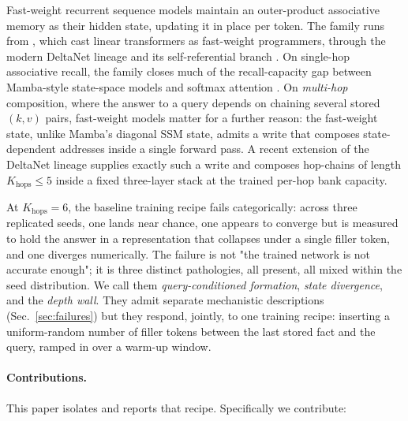 \documentclass[11pt]{article}
\begin{document}
Fast-weight recurrent sequence models maintain an outer-product
associative memory as their hidden state, updating it in place per
token. The family runs from \citet{schlag2021linear}, which cast
linear transformers as fast-weight programmers, through the modern
DeltaNet lineage \citep{yang2024deltanet,yang2024gated} and its
self-referential branch \citep{irie2022srwm}. On single-hop associative recall, the family closes much of
the recall-capacity gap between Mamba-style state-space models
\citep{gu2024mamba,dao2024mamba2} and softmax attention
\citep{arora2023zoology,arora2024based}. On \emph{multi-hop}
composition, where the answer to a query depends on chaining several
stored $(k, v)$ pairs, fast-weight models matter for a further
reason: the fast-weight state, unlike Mamba's diagonal SSM state,
admits a write that composes state-dependent addresses inside a
single forward pass. A recent extension of the DeltaNet
lineage supplies exactly such a write and composes hop-chains of
length $K_{\mathrm{hops}} \le 5$ inside a fixed three-layer stack at
the trained per-hop bank capacity.

At $K_{\mathrm{hops}} = 6$, the baseline training recipe fails
categorically: across three replicated seeds, one lands near chance,
one appears to converge but is measured to hold the answer in a
representation that collapses under a single filler token, and one
diverges numerically. The failure is not "the trained network is not
accurate enough"; it is three distinct pathologies, all present, all
mixed within the seed distribution. We call them
\emph{query-conditioned formation}, \emph{state divergence}, and the
\emph{depth wall}. They admit separate mechanistic descriptions
(Sec.~\ref{sec:failures}) but they respond, jointly, to one training
recipe: inserting a uniform-random number of filler tokens between the
last stored fact and the query, ramped in over a warm-up window.

\paragraph{Contributions.} This paper isolates and reports that
recipe. Specifically we contribute:
\end{document}
